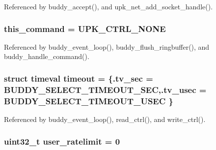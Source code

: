 Referenced by buddy\_\-accept(), and upk\_\-net\_\-add\_\-socket\_\-handle().

\subsubsection[{this\_\-command}]{ {\bf this\_\-command} = UPK\_\-CTRL\_\-NONE\hspace{0.3cm}{\ttfamily  [static]}}\label{buddy_8c_a398354ab30be5dc1e885373b075798c8}


Referenced by buddy\_\-event\_\-loop(), buddy\_\-flush\_\-ringbuffer(), and buddy\_\-handle\_\-command().

\subsubsection[{timeout}]{\setlength{\rightskip}{0pt plus 5cm}struct timeval {\bf timeout} = \{.tv\_\-sec = BUDDY\_\-SELECT\_\-TIMEOUT\_\-SEC,.tv\_\-usec = BUDDY\_\-SELECT\_\-TIMEOUT\_\-USEC \}\hspace{0.3cm}{\ttfamily  [static]}}\label{buddy_8c_a03a5df464f7f59f8fe9f8da62642ce06}


Referenced by buddy\_\-event\_\-loop(), read\_\-ctrl(), and write\_\-ctrl().

\subsubsection[{user\_\-ratelimit}]{\setlength{\rightskip}{0pt plus 5cm}uint32\_\-t {\bf user\_\-ratelimit} = 0}\label{buddy_8c_ae27137b4c4b5c8be0a91356bfab19ee1}
